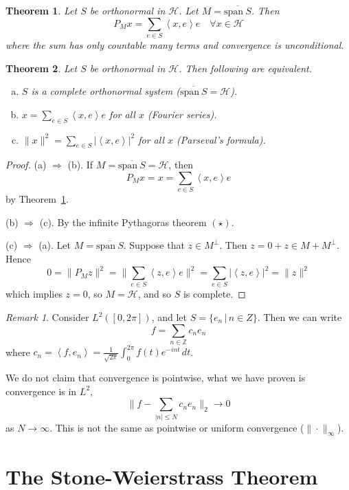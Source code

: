 \documentclass[10pt, oneside, reqno]{amsbook}
\theoremstyle{plain}%
\newtheorem{thm}{Theorem}[section]
\theoremstyle{definition}
\theoremstyle{remark}
\newtheorem*{rem}{Remark}
\newcommand{\Hil}{\mathcal{H}}
\newcommand{\Z}{\mathbb{Z}}
\newcommand{\iprod}[1]{\left\langle #1 \right\rangle}
\newcommand{\spans}{\text{span}\ }
\begin{document}
\begin{thm}\label{thm:fourier}
    Let $S$ be orthonormal in $\Hil$.  Let $M = \overline{\spans S}$.  Then \[
        P_Mx = \sum_{e \in S} \iprod{x, e} e \quad \forall x \in \Hil
    \] where the sum has only countable many terms and convergence is unconditional.
\end{thm}

\begin{thm}
    Let $S$ be orthonormal in $\Hil$.  Then following are equivalent.
    \begin{enumerate}[(a)]
        \item $S$ is a complete orthonormal system ($\overline{\spans S} = \Hil$).
        \item $x = \sum_{e \in S} \iprod{x,e} e$ for all $x$ (Fourier series).
        \item $\| x \|^2 = \sum_{e \in S} |\iprod{x,e}|^2$ for all $x$ (Parseval's formula).
    \end{enumerate}
\end{thm}

\begin{proof}
    (a) $\Rightarrow$ (b).  If $M = \overline{\spans S} = \Hil$, then \[
        P_M x = x = \sum_{e \in S} \iprod{x,e} e
    \] by Theorem~\ref{thm:fourier}.
    
    (b) $\Rightarrow$ (c).  By the infinite Pythagoras theorem $(\star)$.  
    
    (c) $\Rightarrow$ (a).  Let $M = \overline{\spans S}$. Suppose that $z \in M^\perp$.  Then $z = 0 + z \in M + M^\perp$.  Hence \[
        0 = \| P_M z \|^2 = \|\sum_{e \in S} \iprod{z,e} e \|^2 = \sum_{e \in S} |\iprod{z,e} |^2 = \| z \|^2 
    \] which implies $z = 0$, so $M = \Hil$, and so $S$ is complete.
\end{proof}

\begin{rem}
    Consider $L^2([0,2\pi])$, and let $S = \{ e_n \, | \, n \in Z \}$.  Then we can write \[
         f = \sum_{ n \in \Z} c_n e_n
    \] where $c_n = \iprod{f,e_n} = \frac{1}{\sqrt{2 \pi}} \int_0^{2\pi} f(t) e^{-in t} \, dt$.  
    
    We do not claim that convergence is pointwise, what we have proven is convergence is in $L^2$, \[
        \| f - \sum_{|n| \leq N} c_n e_n \|_2 \rightarrow 0
    \] as $N \rightarrow \infty$.  This is not the same as pointwise or uniform convergence ($\| \cdot \|_\infty$).  
\end{rem}

\section{The Stone-Weierstrass Theorem} %
\label{sec:the_stone_weierstrass_theorem}
\end{document}
